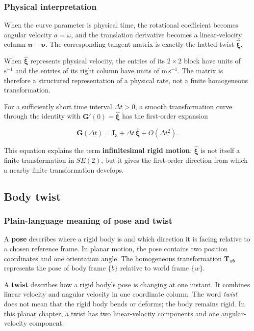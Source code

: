 \documentclass[
  australian,
  12pt,
  letterpaper,
  DIV=11,
  numbers=noendperiod,
  twoside]{scrreprt}
\begin{document}
\subsubsection{Physical interpretation}\label{physical-interpretation}

When the curve parameter is physical time, the rotational coefficient
becomes angular velocity \(a=\omega\), and the translation derivative
becomes a linear-velocity column \(\mathbf u=\boldsymbol\nu\). The
corresponding tangent matrix is exactly the hatted twist
\(\widehat{\boldsymbol\xi}\).

When \(\widehat{\boldsymbol\xi}\) represents physical velocity, the
entries of its \(2\times2\) block have units of \(\mathrm{s^{-1}}\) and
the entries of its right column have units of \(\mathrm{m\,s^{-1}}\).
The matrix is therefore a structured representation of a physical rate,
not a finite homogeneous transformation.

For a sufficiently short time interval \(\Delta t>0\), a smooth
transformation curve through the identity with
\(\mathbf G'(0)=\widehat{\boldsymbol\xi}\) has the first-order expansion

\[
\mathbf G(\Delta t)
=
\mathbf I_3
+\Delta t\,\widehat{\boldsymbol\xi}
+O(\Delta t^2).
\]

This equation explains the term \textbf{infinitesimal rigid motion}:
\(\widehat{\boldsymbol\xi}\) is not itself a finite transformation in
\(SE(2)\), but it gives the first-order direction from which a nearby
finite transformation develops.

\subsection{Body twist}\label{sec-se2-body-twist}

\subsubsection{Plain-language meaning of pose and
twist}\label{plain-language-meaning-of-pose-and-twist}

A \textbf{pose} describes where a rigid body is and which direction it
is facing relative to a chosen reference frame. In planar motion, the
pose contains two position coordinates and one orientation angle. The
homogeneous transformation \(\mathbf T_{wb}\) represents the pose of
body frame \(\{b\}\) relative to world frame \(\{w\}\).

A \textbf{twist} describes how a rigid body's pose is changing at one
instant. It combines linear velocity and angular velocity in one
coordinate column. The word \emph{twist} does not mean that the rigid
body bends or deforms; the body remains rigid. In this planar chapter, a
twist has two linear-velocity components and one angular-velocity
component.
\end{document}
